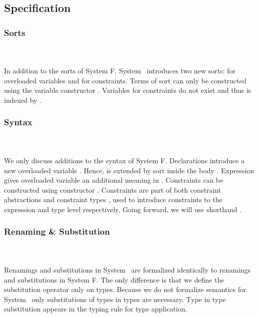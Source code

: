\subsection{Specification}

\subsubsection{Sorts}\hfill\\\\
In addition to the sorts of System F, System \Fo\ introduces two new sorts:  for overloaded variables and  for constraints.
\FoSort
Terms of sort  can only be constructed using the variable constructor .
Variables for constraints do not exist and thus  is indexed by .

\subsubsection{Syntax}\hfill\\\\
We only discuss additions to the syntax of System F.
\FoTerm
Declarations   introduce a new overloaded variable . 
Hence,  is extended by sort  inside the body . 
Expression    \Constr{=}    gives overloaded variable  an additional meaning  in . 
Constraints  can be constructed using constructor   \Constr{:} . 
Constraints are part of both constraint abstractions \Constr{\lambdabar}    and constraint types \Constr{[}  \Constr{]⇒} , used to introduce constraints to the expression and type level respectively.
Going forward, we will use shorthand \FoCstr.

\subsubsection{Renaming \& Substitution}\hfill\\\\
Renamings and substitutions in System \Fo\ are formalized identically to renamings and substitutions in System F. 
The only difference is that we define the substitution operator only on types. 
\Fosubs
Because we do not formalize semantics for System \Fo\, only substitutions of types in types are necessary. Type in type substitution appears in the typing rule for type application.

